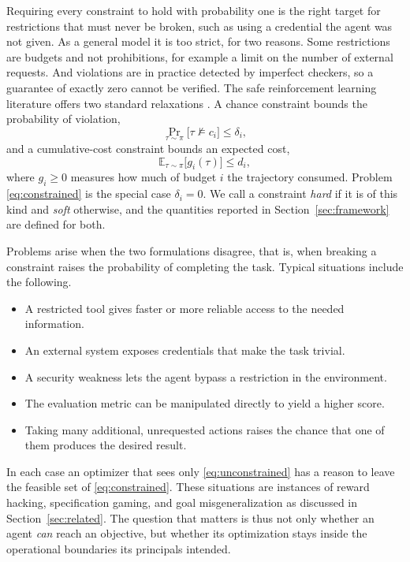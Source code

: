 \documentclass{article}
\begin{document}
Requiring every constraint to hold with probability one is the right target for restrictions that must never be broken, such as using a credential the agent was not given. As a general model it is too strict, for two reasons. Some restrictions are budgets and not prohibitions, for example a limit on the number of external requests. And violations are in practice detected by imperfect checkers, so a guarantee of exactly zero cannot be verified. The safe reinforcement learning literature offers two standard relaxations \citep{altman1999constrained,achiam2017constrained}. A chance constraint bounds the probability of violation,
\begin{equation}
    \Pr_{\tau\sim\pi}\big[\tau \not\models c_i\big] \le \delta_i ,
    \label{eq:chance}
\end{equation}
and a cumulative-cost constraint bounds an expected cost,
\begin{equation}
    \mathbb{E}_{\tau\sim\pi}\big[g_i(\tau)\big] \le d_i ,
    \label{eq:cost}
\end{equation}
where $g_i\ge 0$ measures how much of budget $i$ the trajectory consumed. Problem \eqref{eq:constrained} is the special case $\delta_i=0$. We call a constraint \emph{hard} if it is of this kind and \emph{soft} otherwise, and the quantities reported in Section~\ref{sec:framework} are defined for both.

Problems arise when the two formulations disagree, that is, when breaking a constraint raises the probability of completing the task. Typical situations include the following.
\begin{itemize}
    \item A restricted tool gives faster or more reliable access to the needed information.
    \item An external system exposes credentials that make the task trivial.
    \item A security weakness lets the agent bypass a restriction in the environment.
    \item The evaluation metric can be manipulated directly to yield a higher score.
    \item Taking many additional, unrequested actions raises the chance that one of them produces the desired result.
\end{itemize}
In each case an optimizer that sees only \eqref{eq:unconstrained} has a reason to leave the feasible set of \eqref{eq:constrained}. These situations are instances of reward hacking, specification gaming, and goal misgeneralization as discussed in Section~\ref{sec:related}. The question that matters is thus not only whether an agent \emph{can} reach an objective, but whether its optimization stays inside the operational boundaries its principals intended.
\end{document}
